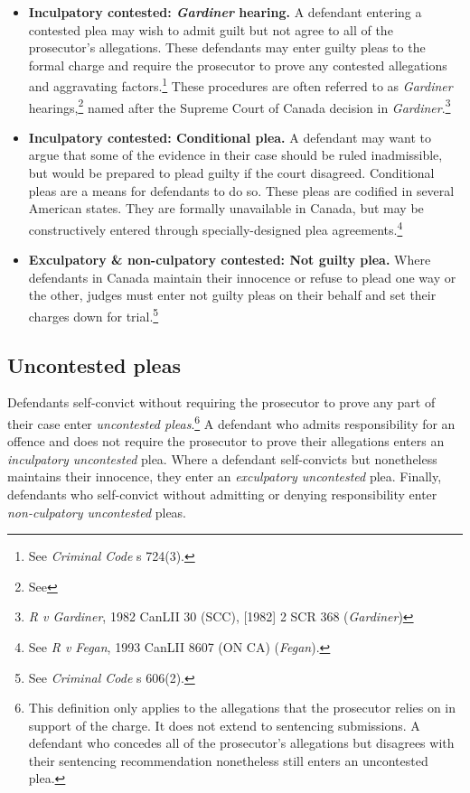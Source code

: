 \begin{itemize}
    \item \textbf{Inculpatory contested: \textit{Gardiner} hearing.} A defendant entering a contested plea may wish to admit guilt but not agree to all of the prosecutor's allegations. These defendants may enter guilty pleas to the formal charge and require the prosecutor to prove any contested allegations and aggravating factors.\footnote{See \textit{Criminal Code} s 724(3).} These procedures are often referred to as \textit{Gardiner} hearings,\footnote{See} named after the Supreme Court of Canada decision in \textit{Gardiner}.\footnote{\textit{R v Gardiner}, 1982 CanLII 30 (SCC), [1982] 2 SCR 368 (\textit{Gardiner})}
    
    \item \textbf{Inculpatory contested: Conditional plea.} A defendant may want to argue that some of the evidence in their case should be ruled inadmissible, but would be prepared to plead guilty if the court disagreed. Conditional pleas are a means for defendants to do so. These pleas are codified in several American states. They are formally unavailable in Canada, but may be constructively entered through specially-designed plea agreements.\footnote{See \textit{R v Fegan}, 1993 CanLII 8607 (ON CA) (\textit{Fegan}).}
    
    \item \textbf{Exculpatory \& non-culpatory contested: Not guilty plea.} Where defendants in Canada maintain their innocence or refuse to plead one way or the other, judges must enter not guilty pleas on their behalf and set their charges down for trial.\footnote{See \textit{Criminal Code} s 606(2).}
    
\end{itemize}

\subsection{Uncontested pleas}

Defendants self-convict without requiring the prosecutor to prove any part of their case enter \textit{uncontested pleas}.\footnote{This definition only applies to the allegations that the prosecutor relies on in support of the charge. It does not extend to sentencing submissions. A defendant who concedes all of the prosecutor's allegations but disagrees with their sentencing recommendation nonetheless still enters an uncontested plea.} A defendant who admits responsibility for an offence and does not require the prosecutor to prove their allegations enters an \textit{inculpatory uncontested} plea. Where a defendant self-convicts but nonetheless maintains their innocence, they enter an \textit{exculpatory uncontested} plea. Finally, defendants who self-convict without admitting or denying responsibility enter \textit{non-culpatory uncontested} pleas. 

